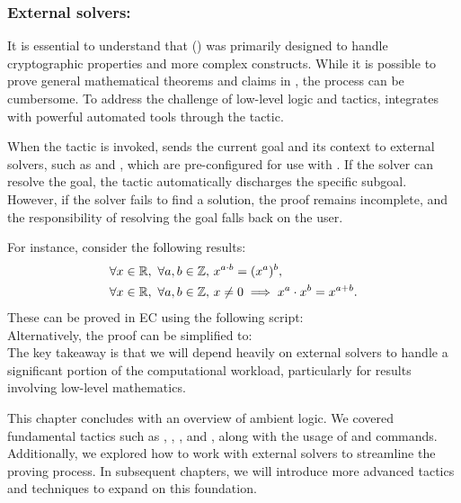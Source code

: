 
\newpage
\subsubsection{External solvers: }
It is essential to understand that \EasyCrypt (\EC) was primarily designed to handle cryptographic properties and more complex constructs. While it is possible to prove general mathematical theorems and claims in \EC, the process can be cumbersome. To address the challenge of low-level logic and tactics, \EC integrates with powerful automated tools through the  tactic.

When the  tactic is invoked, \EC sends the current goal and its context to external \SMT solvers, such as \ZThree and \AltErgo, which are pre-configured for use with \EC. If the \SMT solver can resolve the goal, the  tactic automatically discharges the specific subgoal. However, if the solver fails to find a solution, the proof remains incomplete, and the responsibility of resolving the goal falls back on the user.

For instance, consider the following results: \begin{align*}
\forall x\in\mathbb{R},\ \forall a,b\in\mathbb{Z},\ &x^{a\cdot b}=(x^a)^b,\\
\forall x\in\mathbb{R},\ \forall a,b\in\mathbb{Z},\ &x\neq0\implies x^a\cdot x^b=x^{a+b}.
\end{align*}
These can be proved in EC using the following script:\\
Alternatively, the proof can be simplified to:\\
The key takeaway is that we will depend heavily on external solvers to handle a significant portion of the computational workload, particularly for results involving low-level mathematics.

This chapter concludes with an overview of ambient logic. We covered fundamental tactics such as , , , and , along with the usage of  and  commands. Additionally, we explored how to work with external solvers to streamline the proving process. In subsequent chapters, we will introduce more advanced tactics and techniques to expand on this foundation.